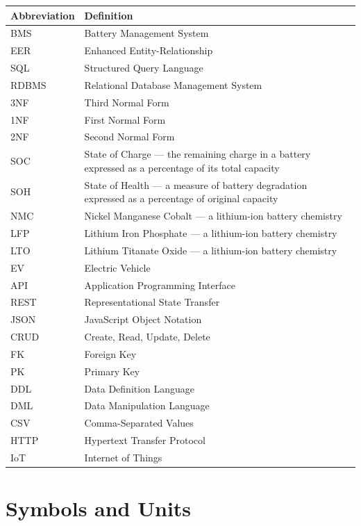\documentclass[12pt, a4paper]{report}
\begin{document}
\begin{longtable}{@{} p{3cm} p{11cm} @{}}
    \toprule
    \textbf{Abbreviation} & \textbf{Definition} \\
    \midrule
    \endhead
    BMS     & Battery Management System \\
    EER     & Enhanced Entity-Relationship \\
    SQL     & Structured Query Language \\
    RDBMS   & Relational Database Management System \\
    3NF     & Third Normal Form \\
    1NF     & First Normal Form \\
    2NF     & Second Normal Form \\
    SOC     & State of Charge — the remaining charge in a battery expressed as a percentage of its total capacity \\
    SOH     & State of Health — a measure of battery degradation expressed as a percentage of original capacity \\
    NMC     & Nickel Manganese Cobalt — a lithium-ion battery chemistry \\
    LFP     & Lithium Iron Phosphate — a lithium-ion battery chemistry \\
    LTO     & Lithium Titanate Oxide — a lithium-ion battery chemistry \\
    EV      & Electric Vehicle \\
    API     & Application Programming Interface \\
    REST    & Representational State Transfer \\
    JSON    & JavaScript Object Notation \\
    CRUD    & Create, Read, Update, Delete \\
    FK      & Foreign Key \\
    PK      & Primary Key \\
    DDL     & Data Definition Language \\
    DML     & Data Manipulation Language \\
    CSV     & Comma-Separated Values \\
    HTTP    & Hypertext Transfer Protocol \\
    IoT     & Internet of Things \\
    \bottomrule
\end{longtable}

\section*{Symbols and Units}
\end{document}
